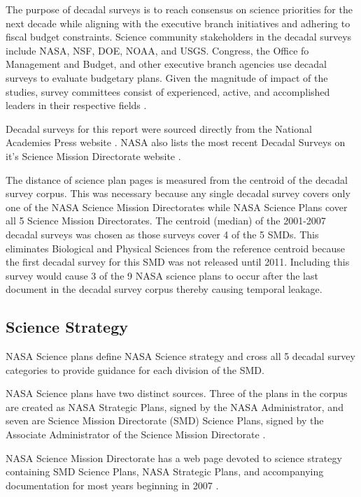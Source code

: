 \documentclass[preprint,12pt]{elsarticle}
\begin{document}
The purpose of decadal surveys is to reach consensus on science priorities for the next decade while aligning with the executive branch initiatives and adhering to fiscal budget constraints. Science community stakeholders in the decadal surveys include NASA, NSF, DOE, NOAA, and USGS. Congress, the Office fo Management and Budget, and other executive branch agencies use decadal surveys to evaluate budgetary plans. Given the magnitude of impact of the studies, survey committees consist of experienced, active, and accomplished leaders in their respective fields \cite{Academies2015_lessons}.

Decadal surveys for this report were sourced directly from the National Academies Press website \cite{Academies_decadal}. NASA also lists the most recent Decadal Surveys on it's Science Mission Directorate website \cite{NASA_decadal}.

The distance of science plan pages is measured from the centroid of the decadal survey corpus. This was necessary because any single decadal survey covers only one of the NASA Science Mission Directorates while NASA Science Plans cover all 5 Science Mission Directorates. The centroid (median) of the 2001-2007 decadal surveys was chosen as those surveys cover 4 of the 5 SMDs. This eliminates Biological and Physical Sciences from the reference centroid because the first decadal survey for this SMD was not released until 2011. Including this survey would cause 3 of the 9 NASA science plans to occur after the last document in the decadal survey corpus thereby causing temporal leakage. 

\subsection{Science Strategy}
NASA Science plans define NASA Science strategy and cross all 5 decadal survey categories to provide guidance for each division of the SMD. 

NASA Science plans have two distinct sources. Three of the plans in the corpus are created as NASA Strategic Plans, signed by the NASA Administrator, and seven are Science Mission Directorate (SMD) Science Plans, signed by the Associate Administrator of the Science Mission Directorate\cite{SMD_2007} \cite{SMD_2010} \cite{NSP_2011} \cite{SMD_2014} \cite{NSP_2018} \cite{SMD_2020} \cite{NSP_2022} \cite{SMD_2022} \cite{SMD_2023} \cite{SMD_2025}.

 NASA Science Mission Directorate has a web page devoted to science strategy containing SMD Science Plans, NASA Strategic Plans, and accompanying documentation for most years beginning in 2007 \cite{NASA_sci_strat}. 
\end{document}
